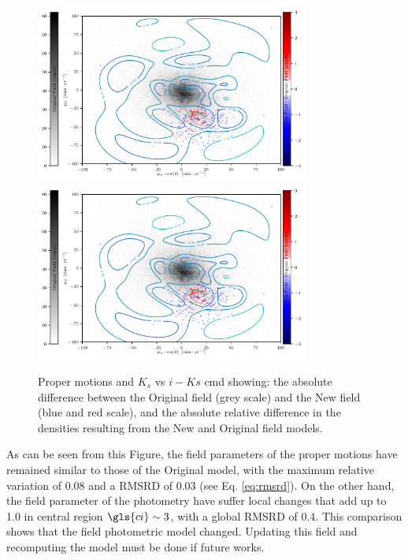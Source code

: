 \begin{figure}[ht!]
\begin{center}
\includegraphics[page=1,width=0.8\textwidth]{background/Figures/DifferenceField.pdf}
\includegraphics[page=5,width=0.8\textwidth]{background/Figures/DifferenceField.pdf}
\caption{Proper motions and $K_s$ vs $i-Ks$ \gls{cmd} showing: the absolute difference between the Original field (grey scale) and the New field (blue and red scale), and the absolute relative difference in the densities resulting from the New and Original field models. }
\label{fig:FieldChecking}
\end{center}
\end{figure}

As can be seen from this Figure, the field parameters of the proper motions have remained similar to those of the Original model, with the maximum relative variation of 0.08 and a RMSRD of 0.03 (see Eq. \ref{eq:rmsrd}). On the other hand, the field parameter of the photometry have suffer local changes that add up to 1.0 in central region $\gls{ci}\sim3$, with a global RMSRD of 0.4. This comparison shows that the field photometric model changed. Updating this field and recomputing the model must be done if future works.

